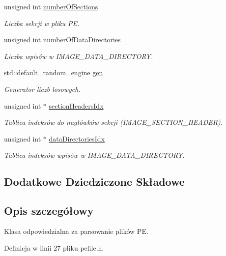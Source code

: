 \begin{DoxyCompactItemize}
unsigned int \hyperlink{class_p_e_file_aa80eaa25eb050efe1bfced2518e21842}{number\-Of\-Sections}
\begin{DoxyCompactList}\small\item\em Liczba sekcji w pliku P\-E. \end{DoxyCompactList}\item 
unsigned int \hyperlink{class_p_e_file_a46392c7d5a4e12bc852674e9b692217e}{number\-Of\-Data\-Directories}
\begin{DoxyCompactList}\small\item\em Liczba wpisów w I\-M\-A\-G\-E\-\_\-\-D\-A\-T\-A\-\_\-\-D\-I\-R\-E\-C\-T\-O\-R\-Y. \end{DoxyCompactList}\item 
std\-::default\-\_\-random\-\_\-engine \hyperlink{class_p_e_file_a2778890ee00bd2ee99f4d5757961f222}{gen}
\begin{DoxyCompactList}\small\item\em Generator liczb losowych. \end{DoxyCompactList}\item 
unsigned int $\ast$ \hyperlink{class_p_e_file_a30065d3448d3f6f71cb18dd0ea954be2}{section\-Headers\-Idx}
\begin{DoxyCompactList}\small\item\em Tablica indeksów do nagłówków sekcji (I\-M\-A\-G\-E\-\_\-\-S\-E\-C\-T\-I\-O\-N\-\_\-\-H\-E\-A\-D\-E\-R). \end{DoxyCompactList}\item 
unsigned int $\ast$ \hyperlink{class_p_e_file_acc624dc6b876fbfb22e7fe2114c36bdd}{data\-Directories\-Idx}
\begin{DoxyCompactList}\small\item\em Tablica indeksów wpisów w I\-M\-A\-G\-E\-\_\-\-D\-A\-T\-A\-\_\-\-D\-I\-R\-E\-C\-T\-O\-R\-Y. \end{DoxyCompactList}\end{DoxyCompactItemize}
\subsection*{Dodatkowe Dziedziczone Składowe}


\subsection{Opis szczegółowy}
Klasa odpowiedzialna za parsowanie plików P\-E. 

Definicja w linii 27 pliku pefile.\-h.



